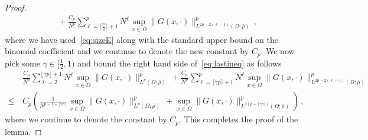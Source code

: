 \documentclass[a4paper,10pt,twoside]{amsart}
\theoremstyle{remark}
\theoremstyle{definition}
\numberwithin{equation}{section}
\newcommand{\0}{{\bf 0}}
\newcommand{\+}{\hspace{-.5ex}+\hspace{-.5ex}}
\begin{document}
\begin{proof}
\begin{align}
& \, + \frac{{C_p}}{N^{p}} \sum_{\ell=\lceil\frac p2\rceil +1}^{p} N^{\ell} \sup_{x \in \Omega} \lVert  G(x,\cdot)\rVert_{L^{2p-2(\ell-1)}(\Omega;\bar\rho)}^{p}\label{eq:lastineq} \, ,
\end{align}
where we have used~\eqref{eq:sizeE} along with the standard upper bound on the binomial coefficient and we continue to denote the new constant by $C_p$. We now pick some $\gamma \in [\frac12,1)$ and bound the right hand side of~\eqref{eq:lastineq} as follows
\begin{align}
&\,\frac{{C_p}}{N^{p}} \sum_{\ell=2}^{\lfloor\gamma p\rfloor +1}N^{\ell}\sup_{x \in \Omega} \lVert  G(x,\cdot)\rVert_{L^p(\Omega;\bar\rho)}^{p}\, + \frac{{C_p}}{N^{p}} \sum_{\ell=\lceil\gamma p\rceil +1}^{p} N^{\ell} \sup_{x \in \Omega} \lVert  G(x,\cdot)\rVert_{L^{2p-2(\ell-1)}(\Omega;\bar\rho)}^{p} \\
\leq & \,C_p\left( \frac{1}{N^{p-1-\lfloor \gamma p \rfloor}} \sup_{x \in \Omega} \lVert  G(x,\cdot)\rVert_{L^p(\Omega;\bar\rho)}^{p}\, +  \sup_{x \in \Omega} \lVert  G(x,\cdot)\rVert_{L^{2(p-\lceil \gamma p \rceil)}(\Omega;\bar\rho)}^{p}\right) \, ,
\end{align}
where we continue to denote the constant by $C_p$. This completes the proof of the lemma.
\end{proof}
\end{document}

